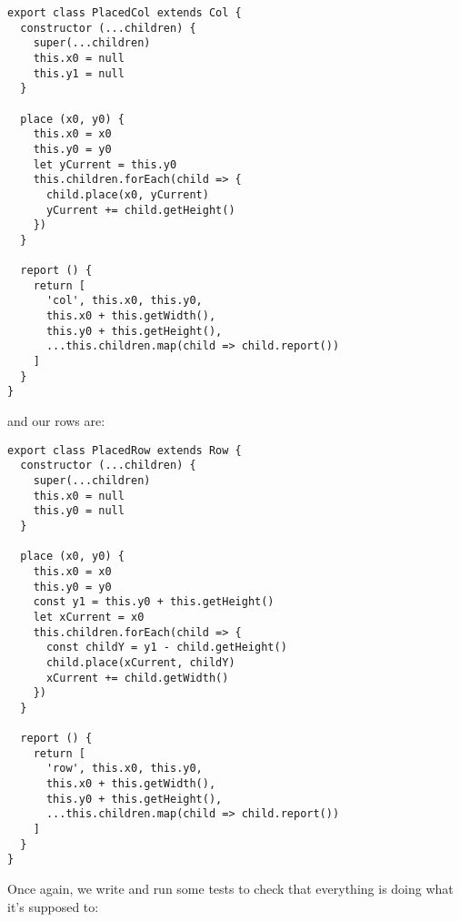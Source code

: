 \documentclass[krantzl]{krantz}
\begin{document}
\begin{lstlisting}[frame=single,frameround=tttt]
export class PlacedCol extends Col {
  constructor (...children) {
    super(...children)
    this.x0 = null
    this.y1 = null
  }

  place (x0, y0) {
    this.x0 = x0
    this.y0 = y0
    let yCurrent = this.y0
    this.children.forEach(child => {
      child.place(x0, yCurrent)
      yCurrent += child.getHeight()
    })
  }

  report () {
    return [
      'col', this.x0, this.y0,
      this.x0 + this.getWidth(),
      this.y0 + this.getHeight(),
      ...this.children.map(child => child.report())
    ]
  }
}
\end{lstlisting}



\noindent and our rows are:


\begin{lstlisting}[frame=single,frameround=tttt]
export class PlacedRow extends Row {
  constructor (...children) {
    super(...children)
    this.x0 = null
    this.y0 = null
  }

  place (x0, y0) {
    this.x0 = x0
    this.y0 = y0
    const y1 = this.y0 + this.getHeight()
    let xCurrent = x0
    this.children.forEach(child => {
      const childY = y1 - child.getHeight()
      child.place(xCurrent, childY)
      xCurrent += child.getWidth()
    })
  }

  report () {
    return [
      'row', this.x0, this.y0,
      this.x0 + this.getWidth(),
      this.y0 + this.getHeight(),
      ...this.children.map(child => child.report())
    ]
  }
}
\end{lstlisting}



Once again,
we write and run some tests to check that everything is doing what it's supposed to:
\end{document}
